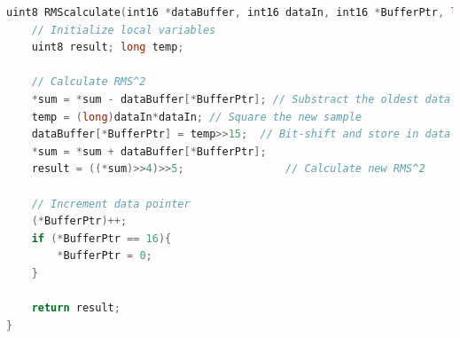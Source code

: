 \begin{lstlisting}[language=C, caption = {Calculate RMS value},label={listingRMSuart}]
uint8 RMScalculate(int16 *dataBuffer, int16 dataIn, int16 *BufferPtr, long *sum){
	// Initialize local variables
	uint8 result; long temp;
	
	// Calculate RMS^2
	*sum = *sum - dataBuffer[*BufferPtr]; // Substract the oldest data from sum
	temp = (long)dataIn*dataIn;	// Square the new sample
	dataBuffer[*BufferPtr] = temp>>15;	// Bit-shift and store in data buffer
	*sum = *sum + dataBuffer[*BufferPtr];
	result = ((*sum)>>4)>>5;				// Calculate new RMS^2
	
	// Increment data pointer
	(*BufferPtr)++;
	if (*BufferPtr == 16){ 
		*BufferPtr = 0;
	}
	
	return result;
}
\end{lstlisting}




